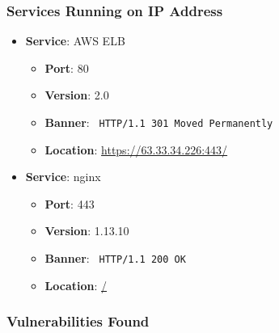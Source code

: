 \documentclass{article}
\begin{document}
\subsubsection*{Services Running on IP Address}

\begin{itemize}
    
        \item \textbf{Service}: AWS ELB
        \begin{itemize}
            \item \textbf{Port}: 80
            \item \textbf{Version}:  2.0 
            \item \textbf{Banner}: \texttt{
                HTTP/1.1 301 Moved Permanently
            }
            \item \textbf{Location}: \href{ https://63.33.34.226:443/ }{ https://63.33.34.226:443/ }
        \end{itemize}
    
        \item \textbf{Service}: nginx
        \begin{itemize}
            \item \textbf{Port}: 443
            \item \textbf{Version}:  1.13.10 
            \item \textbf{Banner}: \texttt{
                HTTP/1.1 200 OK
            }
            \item \textbf{Location}: \href{ / }{ / }
        \end{itemize}
    
\end{itemize}


\subsubsection*{Vulnerabilities Found}
\end{document}
